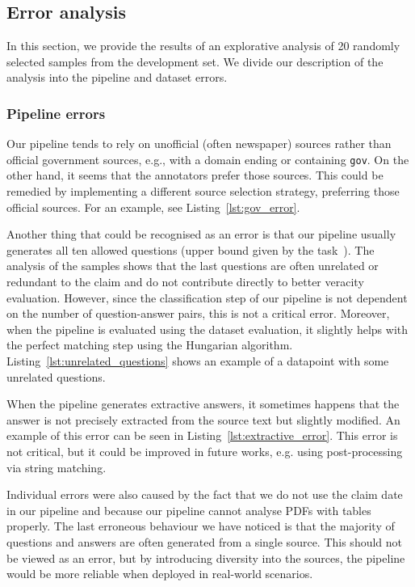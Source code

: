 \subsection{Error analysis}
In this section, we provide the results of an explorative analysis of 20 randomly selected samples from the development set. We divide our description of the analysis into the pipeline and dataset errors.


\subsubsection{Pipeline errors}
Our pipeline tends to rely on unofficial (often newspaper) sources rather than official government sources, e.g., with a domain ending or containing \texttt{gov}. On the other hand, it seems that the annotators prefer those sources. This could be remedied by implementing a different source selection strategy, preferring those official sources. For an example, see Listing~\ref{lst:gov_error}.

Another thing that could be recognised as an error is that our pipeline usually generates all ten allowed questions (upper bound given by the task~\cite{averitec2024}). The analysis of the samples shows that the last questions are often unrelated or redundant to the claim and do not contribute directly to better veracity evaluation. However, since the classification step of our pipeline is not dependent on the number of question-answer pairs, this is not a critical error. Moreover, when the pipeline is evaluated using the \averitec{} dataset evaluation, it slightly helps with the perfect matching step using the Hungarian algorithm. Listing~\ref{lst:unrelated_questions} shows an example of a datapoint with some unrelated questions.

When the pipeline generates extractive answers, it sometimes happens that the answer is not precisely extracted from the source text but slightly modified. An example of this error can be seen in Listing~\ref{lst:extractive_error}. This error is not critical, but it could be improved in future works, e.g. using post-processing via string matching.

Individual errors were also caused by the fact that we do not use the claim date in our pipeline and because our pipeline cannot analyse PDFs with tables properly. The last erroneous behaviour we have noticed is that the majority of questions and answers are often generated from a single source. This should not be viewed as an error, but by introducing diversity into the sources, the pipeline would be more reliable when deployed in real-world scenarios.

